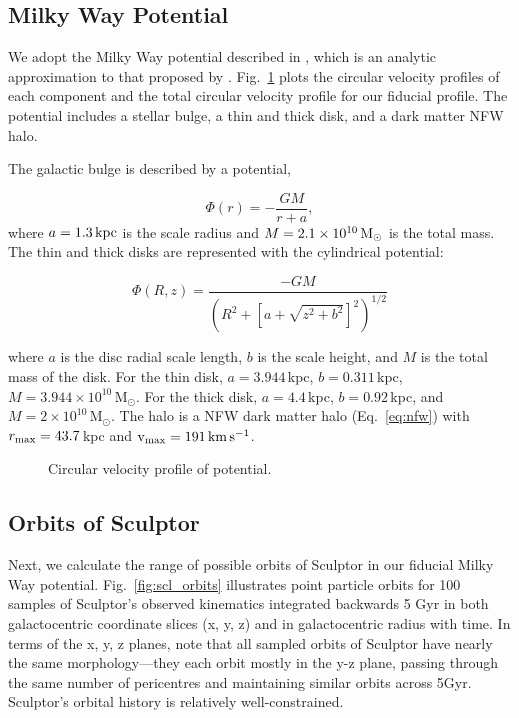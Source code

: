 \subsection{Milky Way Potential}\label{milky-way-potential}

We adopt the Milky Way potential described in \citet{EP2020}, which is
an analytic approximation to that proposed by \citet{mcmillan2011}.
Fig.~\ref{fig:v_circ_potential} plots the circular velocity profiles of
each component and the total circular velocity profile for our fiducial
profile. The potential includes a stellar bulge, a thin and thick disk,
and a dark matter NFW halo.

The galactic bulge is described by a \citet{hernquist1990} potential,

\begin{equation}{
\Phi(r) = - \frac{GM}{r + a},
}\end{equation} where \(a=1.3\,{\rm kpc}\) is the scale radius and
\(M=2.1 \times 10^{10}\,{\rm M}_{\odot}\) is the total mass. The thin and thick
disks are represented with the \citet{miyamoto+nagai1975} cylindrical
potential:

\begin{equation}{
\Phi(R, z) = \frac{-GM}{\left(R^2 + \left[a + \sqrt{z^2 + b^2}\right]^{2}\right)^{1/2}}
}\end{equation}

where \(a\) is the disc radial scale length, \(b\) is the scale height,
and \(M\) is the total mass of the disk. For the thin disk,
\(a=3.944\,\)kpc, \(b=0.311\,\)kpc,
\(M=3.944\times10^{10}\,\)M\(_\odot\). For the thick disk,
\(a=4.4\,\)kpc, \(b=0.92\,\)kpc, and \(M=2\times10^{10}\,\)M\(_\odot\).
The halo is a NFW dark matter halo (Eq.~\ref{eq:nfw}) with
\(r_{\rm max} = 43.7\,\)kpc and \({\rm v}_{\rm max} = 191\,{\rm km\,s^{-1}}\).

\begin{figure}
\centering
{}
\caption[Circular velocity of potential]{Circular velocity profile of
\citet{EP2020} potential.}\label{fig:v_circ_potential}
\end{figure}

\subsection{Orbits of Sculptor}\label{orbits-of-sculptor}

Next, we calculate the range of possible orbits of Sculptor in our
fiducial Milky Way potential. Fig.~\ref{fig:scl_orbits} illustrates
point particle orbits for 100 samples of Sculptor's observed kinematics
integrated backwards 5 Gyr in both galactocentric coordinate slices (x,
y, z) and in galactocentric radius with time. In terms of the x, y, z
planes, note that all sampled orbits of Sculptor have nearly the same
morphology---they each orbit mostly in the y-z plane, passing through
the same number of pericentres and maintaining similar orbits across
5Gyr. Sculptor's orbital history is relatively well-constrained.

